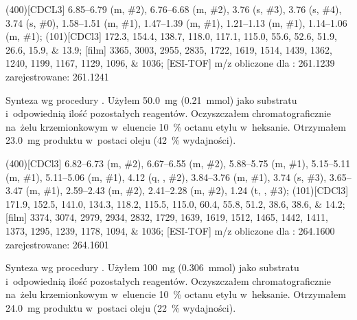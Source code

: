 \begin{fullexp}
  \NMR(400)[CDCL3] \numrange{6.85}{6.79} (m, \#{2}), \numrange{6.76}{6.68} (m, \#{2}), \num{3.76} (s, \#{3}), \num{3.76} (s, \#{4}), \num{3.74} (s, \#{0}), \numrange{1.58}{1.51} (m, \#{1}), \numrange{1.47}{1.39} (m, \#{1}), \numrange{1.21}{1.13} (m, \#{1}), \numrange{1.14}{1.06} (m, \#{1});
  (101)[CDCl3] \numlist{172.3; 154.4; 138.7; 118.0; 117.1; 115.0; 55.6; 52.6; 51.9; 26.6; 15.9; 13.9};
  [film] \numlist{3365; 3003; 2955; 2835; 1722; 1619; 1514; 1439; 1362; 1240; 1199; 1167; 1129; 1096; 1036}; 
	[ESI-TOF] m/z obliczone dla : \num{261.1239} zarejestrowane: \num{261.1241}
\end{fullexp}

Synteza wg procedury .
Użyłem \SI{50.0}{\mg} (\SI{0.21}{\milli\mole})  jako substratu
  i~odpowiednią ilość pozostałych reagentów.
Oczyszczałem chromatograficznie na~żelu krzemionkowym w~eluencie \SI{10}{\percent} octanu
  etylu w~heksanie.
Otrzymałem \SI{23.0}{\mg} produktu w~postaci oleju (\SI{42}{\percent} wydajności).

\begin{fullexp}
	\NMR(400)[CDCl3] \numrange{6.82}{6.73} (m, \#{2}), \numrange{6.67}{6.55} (m, \#{2}), \numrange{5.88}{5.75} (m, \#{1}), \numrange{5.15}{5.11} (m, \#{1}), \numrange{5.11}{5.06} (m, \#{1}), \num{4.12} (q, , \#{2}), \numrange{3.84}{3.76} (m, \#{1}), \num{3.74} (s, \#{3}), \numrange{3.65}{3.47} (m, \#{1}), \numrange{2.59}{2.43} (m, \#{2}), \numrange{2.41}{2.28} (m, \#{2}), \num{1.24} (t, , \#{3}); 
	(101)[CDCl3] \numlist{171.9; 152.5; 141.0; 134.3; 118.2; 115.5; 115.0; 60.4; 55.8; 51.2; 38.6; 38.6; 14.2}; 
	[film] \numlist{3374; 3074; 2979; 2934; 2832; 1729; 1639; 1619; 1512; 1465; 1442; 1411; 1373; 1295; 1239; 1178; 1094; 1036}; 
	[ESI-TOF] m/z obliczone dla : \num{264.1600} zarejestrowane: \num{264.1601}
\end{fullexp}

Synteza wg procedury .
Użyłem \SI{100}{\mg} (\SI{0.306}{\milli\mole})  jako substratu
  i~odpowiednią ilość pozostałych reagentów.
Oczyszczałem chromatograficznie na~żelu krzemionkowym w~eluencie \SI{10}{\percent} octanu
  etylu w~heksanie.
Otrzymałem \SI{24.0}{\mg} produktu w~postaci oleju (\SI{22}{\percent} wydajności).

